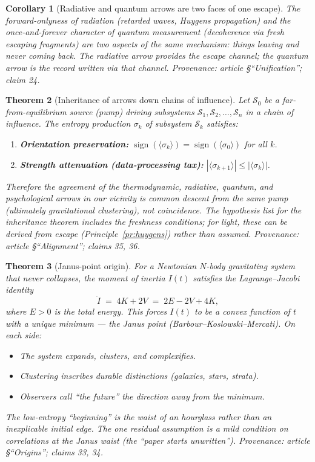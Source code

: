\documentclass[11pt]{article}
\newtheorem{theorem}{Theorem}
\newtheorem{corollary}[theorem]{Corollary}
\newcommand{\cS}{\mathcal{S}}
\begin{document}
\begin{corollary}[Radiative and quantum arrows are two faces of one escape]
  \label{cor:unification}
The forward-onlyness of radiation (retarded waves, Huygens propagation) and
the once-and-forever character of quantum measurement (decoherence via
fresh escaping fragments) are two aspects of the same mechanism: things
leaving and never coming back.  The radiative arrow provides the escape
channel; the quantum arrow is the record written via that channel.
\emph{Provenance: article \S``Unification''; claim 24.}
\end{corollary}

\begin{theorem}[Inheritance of arrows down chains of influence]\label{thm:inherit}
Let $\cS_0$ be a far-from-equilibrium source (pump) driving subsystems
$\cS_1, \cS_2, \ldots, \cS_n$ in a chain of influence.  The entropy
production $\sigma_k$ of subsystem $\cS_k$ satisfies:
\begin{enumerate}
  \item \textbf{Orientation preservation:}
    $\operatorname{sign}(\langle \sigma_k \rangle) =
     \operatorname{sign}(\langle \sigma_0 \rangle)$ for all $k$.
  \item \textbf{Strength attenuation (data-processing tax):}
    $|\langle \sigma_{k+1} \rangle| \leq |\langle \sigma_k \rangle|$.
\end{enumerate}
Therefore the agreement of the thermodynamic, radiative, quantum, and
psychological arrows in our vicinity is common descent from the same pump
(ultimately gravitational clustering), not coincidence.
The hypothesis list for the inheritance theorem includes the freshness
conditions; for light, these can be derived from escape
(Principle~\ref{pr:huygens}) rather than assumed.
\emph{Provenance: article \S``Alignment''; claims 35, 36.}
\end{theorem}

\begin{theorem}[Janus-point origin]\label{thm:janus}
For a Newtonian $N$-body gravitating system that never collapses, the
moment of inertia $I(t)$ satisfies the Lagrange--Jacobi identity
\[
  \ddot{I} \;=\; 4K + 2V \;=\; 2E - 2V + 4K,
\]
where $E > 0$ is the total energy.  This forces $I(t)$ to be a convex
function of $t$ with a unique minimum — the \emph{Janus point}
(Barbour--Koslowski--Mercati).  On each side:
\begin{itemize}
  \item The system expands, clusters, and complexifies.
  \item Clustering inscribes durable distinctions (galaxies, stars, strata).
  \item Observers call ``the future'' the direction away from the minimum.
\end{itemize}
The low-entropy ``beginning'' is the waist of an hourglass rather than an
inexplicable initial edge.  The one residual assumption is a mild condition
on correlations at the Janus waist (the ``paper starts unwritten'').
\emph{Provenance: article \S``Origins''; claims 33, 34.}
\end{theorem}
\end{document}
